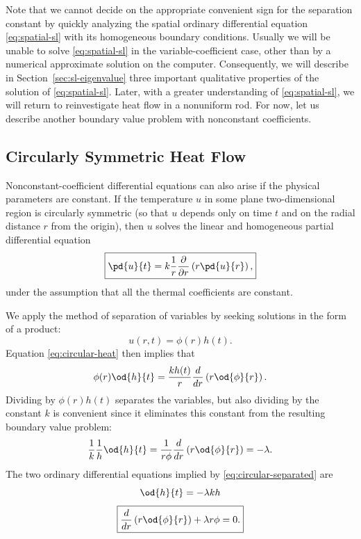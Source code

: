 Note that we cannot decide on the appropriate convenient sign for the separation constant by quickly analyzing the spatial ordinary differential equation \eqref{eq:spatial-sl} with its homogeneous boundary conditions.  Usually we will be unable to solve \eqref{eq:spatial-sl} in the variable-coefficient case, other than by a numerical approximate solution on the computer.  Consequently, we will describe in Section~\ref{sec:sl-eigenvalue} three important qualitative properties of the solution of \eqref{eq:spatial-sl}.  Later, with a greater understanding of \eqref{eq:spatial-sl}, we will return to reinvestigate heat flow in a nonuniform rod.  For now, let us describe another boundary value problem with nonconstant coefficients.

\subsection{Circularly Symmetric Heat Flow}
\label{subsec:circular-heat}

Nonconstant-coefficient differential equations can also arise if the physical parameters are constant.  If the temperature $u$ in some plane two-dimensional region is circularly symmetric (so that $u$ depends only on time $t$ and on the radial distance $r$ from the origin), then $u$ solves the linear and homogeneous partial differential equation
\begin{equation}
\label{eq:circular-heat}
\boxed{\pd{u}{t} = k\frac{1}{r}\frac{\partial}{\partial r}\left(r\pd{u}{r}\right),}
\end{equation}
under the assumption that all the thermal coefficients are constant.

We apply the method of separation of variables by seeking solutions in the form of a product:
\[
u(r,t) = \phi(r)h(t).
\]
Equation \eqref{eq:circular-heat} then implies that
\[
\phi(r)\od{h}{t} = \frac{kh(t)}{r}\frac{d}{d r}\left(r\od{\phi}{r}\right).
\]
Dividing by $\phi(r)h(t)$ separates the variables, but also dividing by the constant $k$ is convenient since it eliminates this constant from the resulting boundary value problem:
\begin{equation}
\label{eq:circular-separated}
\frac{1}{k}\frac{1}{h}\od{h}{t} = \frac{1}{r\phi}\frac{d}{d r}\left(r\od{\phi}{r}\right) = -\lambda.
\end{equation}
The two ordinary differential equations implied by \eqref{eq:circular-separated} are
\begin{equation}
\label{eq:circular-time}
\od{h}{t} = -\lambda k h
\end{equation}
\begin{equation}
\label{eq:circular-spatial}
\boxed{\frac{d}{d r}\left(r\od{\phi}{r}\right) + \lambda r\phi = 0.}
\end{equation}

